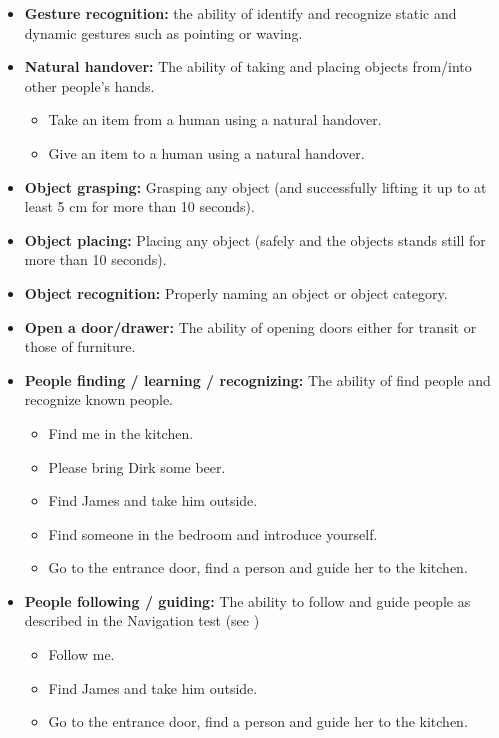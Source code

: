 \begin{itemize}
	\item \textbf{Gesture recognition:} the ability of identify and recognize static and dynamic gestures such as pointing or waving.

	\item \textbf{Natural handover:} The ability of taking and placing objects from/into other people's hands.
	\begin{itemize}
		\item Take an item from a human using a natural handover.
		\item Give an item to a human using a natural handover.
	\end{itemize}

	\item \textbf{Object grasping:} Grasping any object (and successfully lifting it up to at least 5 cm for more than 10 seconds). \\

	\item \textbf{Object placing:} Placing any object (safely and the objects stands still for more than 10 seconds). \\

	\item \textbf{Object recognition:} Properly naming an object or object category. \\

	\item \textbf{Open a door/drawer:} The ability of opening doors either for transit or those of furniture.

	\item \textbf{People finding / learning / recognizing:} The ability of find people and recognize known people.
	\begin{itemize}
		\item Find me in the kitchen.
		\item Please bring Dirk some beer.
		\item Find James and take him outside.
		\item Find someone in the bedroom and introduce yourself.
		\item Go to the entrance door, find a person and guide her to the kitchen.
	\end{itemize}

	\item \textbf{People following / guiding:} The ability to follow and guide people as described in the Navigation test (see )
	\begin{itemize}
		\item Follow me.
		\item Find James and take him outside.
		\item Go to the entrance door, find a person and guide her to the kitchen.
	\end{itemize}


\end{itemize}
